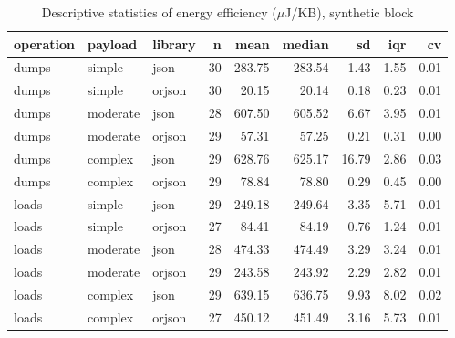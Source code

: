 \begin{table}[ht]
\centering
\begin{tabular}{lllrrrrrr}
  \toprule
operation & payload & library & n & mean & median & sd & iqr & cv \\ 
  \midrule
dumps & simple & json &  30 & 283.75 & 283.54 & 1.43 & 1.55 & 0.01 \\ 
  dumps & simple & orjson &  30 & 20.15 & 20.14 & 0.18 & 0.23 & 0.01 \\ 
  dumps & moderate & json &  28 & 607.50 & 605.52 & 6.67 & 3.95 & 0.01 \\ 
  dumps & moderate & orjson &  29 & 57.31 & 57.25 & 0.21 & 0.31 & 0.00 \\ 
  dumps & complex & json &  29 & 628.76 & 625.17 & 16.79 & 2.86 & 0.03 \\ 
  dumps & complex & orjson &  29 & 78.84 & 78.80 & 0.29 & 0.45 & 0.00 \\ 
  loads & simple & json &  29 & 249.18 & 249.64 & 3.35 & 5.71 & 0.01 \\ 
  loads & simple & orjson &  27 & 84.41 & 84.19 & 0.76 & 1.24 & 0.01 \\ 
  loads & moderate & json &  28 & 474.33 & 474.49 & 3.29 & 3.24 & 0.01 \\ 
  loads & moderate & orjson &  29 & 243.58 & 243.92 & 2.29 & 2.82 & 0.01 \\ 
  loads & complex & json &  29 & 639.15 & 636.75 & 9.93 & 8.02 & 0.02 \\ 
  loads & complex & orjson &  27 & 450.12 & 451.49 & 3.16 & 5.73 & 0.01 \\ 
   \bottomrule
\end{tabular}
\caption{Descriptive statistics of energy efficiency ($\mu$J/KB), synthetic block} 
\label{tab:desc_efficiency}
\end{table}
